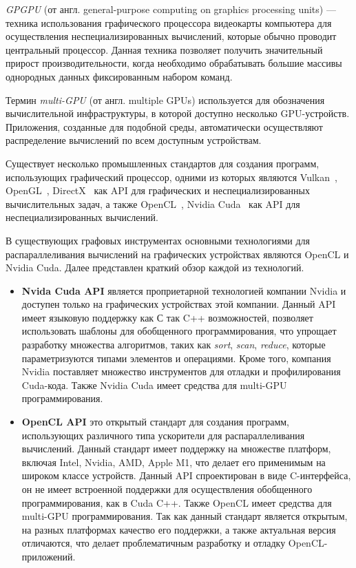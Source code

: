 \textit{GPGPU} (от англ. general-purpose computing on graphics processing units) --- техника использования графического процессора видеокарты компьютера для осуществления неспециализированных вычислений, которые обычно проводит центральный процессор. Данная техника позволяет получить значительный прирост производительности, когда необходимо обрабатывать большие массивы однородных данных фиксированным набором команд. 

Термин \textit{multi-GPU} (от англ. multiple GPUs) используется для обозначения вычислительной инфраструктуры, в которой доступно несколько GPU-устройств. Приложения, созданные для подобной среды, автоматически осуществляют распределение вычислений по всем доступным устройствам. 

Существует несколько промышленных стандартов для создания программ, использующих графический процессор, одними из которых являются Vulkan~\cite{net:spec_vulkan}, OpenGL~\cite{net:spec_opengl}, DirectX~\cite{net:spec_direct3d} как API для графических и неспециализированных вычислительных задач, а также OpenCL~\cite{net:spec_opencl}, Nvidia Cuda~\cite{net:cuda_toolkit_docs} как API для неспециализированных вычислений. 

В существующих графовых инструментах основными технологиями для распараллеливания вычислений на графических устройствах являются OpenCL и Nvidia Cuda. Далее представлен краткий обзор каждой из технологий.

\begin{itemize}
    \item \textbf{Nvida Cuda API} является проприетарной технологией компании Nvidia и доступен только на графических устройствах этой компании. Данный API имеет языковую поддержку как С так C++ возможностей, позволяет использовать шаблоны для обобщенного программирования, что упрощает разработку множества алгоритмов, таких как \textit{sort}, \textit{scan}, \textit{reduce}, которые параметризуются типами элементов и операциями. Кроме того, компания Nvidia поставляет множество инструментов для отладки и профилирования Cuda-кода. Также Nvidia Cuda имеет средства для multi-GPU программирования.
    
    \item \textbf{OpenCL API} это открытый стандарт для создания программ, использующих различного типа ускорители для распараллеливания вычислений. Данный стандарт имеет поддержку на множестве платформ, включая Intel, Nvidia, AMD, Apple M1, что делает его применимым на широком классе устройств. Данный API спроектирован в виде C-интерфейса, он не имеет встроенной поддержки для осуществления обобщенного программирования, как в Cuda C++. Также OpenCL имеет средства для multi-GPU программирования. Так как данный стандарт является открытым, на разных платформах качество его поддержки, а также актуальная версия отличаются, что делает проблематичным разработку и отладку OpenCL-приложений.
\end{itemize}

